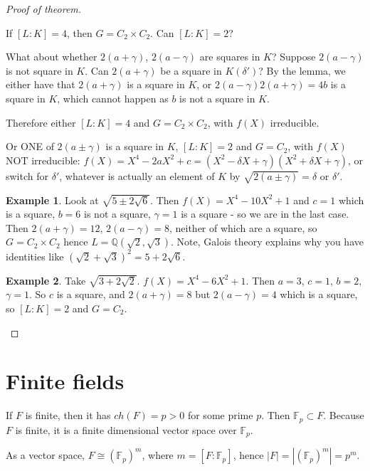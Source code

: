 \documentclass{article}
\theoremstyle{definition}
\newtheorem{exmp}{Example}[section]
\theoremstyle{plain}%
\theoremstyle{remark}
\newcommand{\Q}{\mathbb{Q}}
\begin{document}
\begin{proof}[Proof of theorem]
\begin{enumerate}
        If $[L : K] = 4$, then $G = C_2 \times C_2$. Can $[L : K] = 2$?
        
        What about whether $2(a + \gamma)$, $2(a - \gamma)$ are squares in $K$? Suppose $2(a - \gamma)$ is not square in $K$. Can $2(a + \gamma)$ be a square in $K(\delta')$? By the lemma, we either have that $2(a + \gamma)$ is a square in $K$, or $2(a - \gamma)2(a + \gamma) = 4b$ is a square in $K$, which cannot happen as $b$ is not a square in $K$.
        
        Therefore either $[L : K] = 4$ and $G = C_2 \times C_2$, with $f(X)$ irreducible.
        
        Or ONE of $2(a \pm \gamma)$ is a square in $K$, $[L : K] = 2$ and $G = C_2$, with $f(X)$ NOT irreducible: $f(X) = X^4 - 2aX^2 + c = (X^2 - \delta X + \gamma)(X^2 + \delta X + \gamma)$, or switch for $\delta'$, whatever is actually an element of $K$ by $\sqrt{2(a \pm \gamma)} = \delta$ or $\delta'$.
    \end{enumerate}
    
    \begin{exmp}
        Look at $\sqrt{5 \pm 2\sqrt{6}}$. Then $f(X) = X^4 -10X^2 + 1$ and $c = 1$ which is a square, $b = 6$ is not a square, $\gamma = 1$ is a square - so we are in the last case. Then $2(a + \gamma) = 12$, $2(a - \gamma) = 8$, neither of which are a square, so $G = C_2 \times C_2$ hence $L = \Q(\sqrt{2}, \sqrt{3})$. Note, Galois theory explains why you have identities like $(\sqrt{2} + \sqrt{3})^2 = 5 + 2\sqrt{6}$.
    \end{exmp}
    
    \begin{exmp}
        Take $\sqrt{3 + 2\sqrt{2}}$. $f(X) = X^4 - 6X^2 + 1$. Then $a = 3$, $c = 1$, $b = 2$, $\gamma = 1$. So $c$ is a square, and $2(a + \gamma) = 8$ but $2(a - \gamma) = 4$ which is a square, so $[L : K] = 2$ and $G = C_2$.
    \end{exmp}
\end{proof}

\section{Finite fields}

If $F$ is finite, then it has $ch(F) = p >0$ for some prime $p$. Then $\mathbb{F}_p \subset F$. Because $F$ is finite, it is a finite dimensional vector space over $\mathbb{F}_p$.

As a vector space, $F \cong (\mathbb{F}_p)^m$, where $m = [F : \mathbb{F}_p]$, hence $|F| = |(\mathbb{F}_p)^m| = p^m$.
\end{document}
